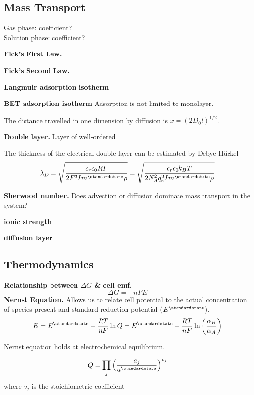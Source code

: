 \subsection*{Mass Transport}

Gas phase: coefficient? \\
Solution phase: coefficient?

\textbf{Fick's First Law.}

\textbf{Fick's Second Law.}

\textbf{Langmuir adsorption isotherm}

\textbf{BET adsorption isotherm}
Adsorption is not limited to monolayer.

The distance travelled in one dimension by diffusion is $x = (2D_0t)^{1/2}$.

\textbf{Double layer.} Layer of well-ordered

The thickness of the electrical double layer can be estimated by Debye-H\"uckel
\begin{equation*}
    \lambda_D = \sqrt{\frac{\epsilon_r \epsilon_0RT}{2F^2Im^\standardstate\rho}} = \sqrt{\frac{\epsilon_r \epsilon_0 k_B T}{2N_A^2q_e^2Im^\standardstate\rho}}
\end{equation*}

\textbf{Sherwood number.} Does advection or diffusion dominate mass transport in the system?

\textbf{ionic strength}

\textbf{diffusion layer}

\subsection*{Thermodynamics}
\textbf{Relationship between $\Delta G$ \& cell emf.}
\begin{equation*}
    \Delta G = -nFE
\end{equation*}
\textbf{Nernst Equation.} Allows us to relate cell potential to the actual concentration of species
present and standard reduction potential ($E^\standardstate$).
\begin{equation*}
    E = E^\standardstate - \frac{RT}{nF} \ln Q = E^\standardstate - \frac{RT}{nF} \ln\left(\frac{\alpha_B}{\alpha_A}\right)
\end{equation*}

Nernst equation holds at electrochemical equilibrium.

\begin{equation*}
    Q = \prod_j \left(\frac{a_j}{a^\standardstate}\right)^{v_j}
\end{equation*}
where $v_j$ is the stoichiometric coefficient

